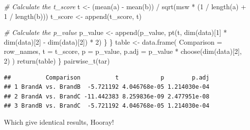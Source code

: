 \documentclass[
]{article}
\newenvironment{Shaded}{\begin{snugshade}}{\end{snugshade}}
\newcommand{\AttributeTok}[1]{\textcolor[rgb]{0.77,0.63,0.00}{#1}}
\newcommand{\CommentTok}[1]{\textcolor[rgb]{0.56,0.35,0.01}{\textit{#1}}}
\newcommand{\DecValTok}[1]{\textcolor[rgb]{0.00,0.00,0.81}{#1}}
\newcommand{\FunctionTok}[1]{\textcolor[rgb]{0.00,0.00,0.00}{#1}}
\newcommand{\NormalTok}[1]{#1}
\newcommand{\OtherTok}[1]{\textcolor[rgb]{0.56,0.35,0.01}{#1}}
\newcommand{\SpecialCharTok}[1]{\textcolor[rgb]{0.00,0.00,0.00}{#1}}
\begin{document}
\begin{Shaded}
\begin{Highlighting}[]
      \CommentTok{\# Calculate the t\_score}
\NormalTok{      t }\OtherTok{\textless{}{-}}\NormalTok{ (}\FunctionTok{mean}\NormalTok{(a) }\SpecialCharTok{{-}} \FunctionTok{mean}\NormalTok{(b)) }\SpecialCharTok{/} \FunctionTok{sqrt}\NormalTok{(msw }\SpecialCharTok{*}\NormalTok{ (}\DecValTok{1} \SpecialCharTok{/} \FunctionTok{length}\NormalTok{(a) }\SpecialCharTok{+} \DecValTok{1} \SpecialCharTok{/} \FunctionTok{length}\NormalTok{(b)))}
\NormalTok{      t\_score }\OtherTok{\textless{}{-}} \FunctionTok{append}\NormalTok{(t\_score, t)}
      
      \CommentTok{\# Calculate the p\_value}
\NormalTok{      p\_value }\OtherTok{\textless{}{-}} \FunctionTok{append}\NormalTok{(p\_value, }\FunctionTok{pt}\NormalTok{(t, }\FunctionTok{dim}\NormalTok{(data)[}\DecValTok{1}\NormalTok{] }\SpecialCharTok{*} \FunctionTok{dim}\NormalTok{(data)[}\DecValTok{2}\NormalTok{] }\SpecialCharTok{{-}} \FunctionTok{dim}\NormalTok{(data)[}\DecValTok{2}\NormalTok{]) }\SpecialCharTok{*} \DecValTok{2}\NormalTok{)}
\NormalTok{    \}}
\NormalTok{  \}}
\NormalTok{  table }\OtherTok{\textless{}{-}} \FunctionTok{data.frame}\NormalTok{(}
    \AttributeTok{Comparison =}\NormalTok{ row\_names,}
    \AttributeTok{t =}\NormalTok{ t\_score,}
    \AttributeTok{p =}\NormalTok{ p\_value,}
    \AttributeTok{p.adj =}\NormalTok{ p\_value }\SpecialCharTok{*} \FunctionTok{choose}\NormalTok{(}\FunctionTok{dim}\NormalTok{(data)[}\DecValTok{2}\NormalTok{], }\DecValTok{2}\NormalTok{)}
\NormalTok{  )}
  \FunctionTok{return}\NormalTok{(table)}
\NormalTok{\}}
\FunctionTok{pairwise\_t}\NormalTok{(tar)}
\end{Highlighting}
\end{Shaded}

\begin{verbatim}
##          Comparison          t            p        p.adj
## 1 BrandA vs. BrandB  -5.721192 4.046768e-05 1.214030e-04
## 2 BrandA vs. BrandC -11.442383 8.259836e-09 2.477951e-08
## 3 BrandB vs. BrandC  -5.721192 4.046768e-05 1.214030e-04
\end{verbatim}

Which give identical results, Hooray!
\end{document}
